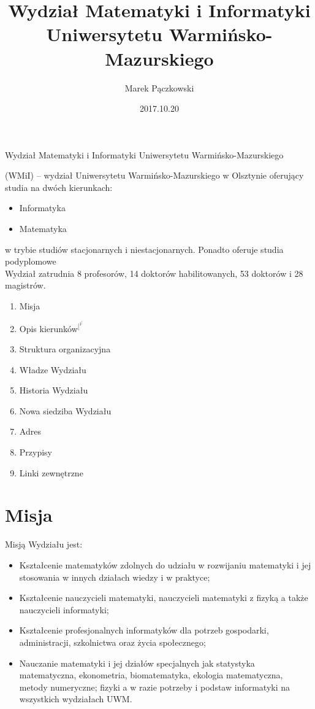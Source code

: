 ﻿\documentclass[a4paper,12pt]{article}
\date{2017.10.20}
\title {\bf Wydział Matematyki i Informatyki Uniwersytetu
Warmińsko-Mazurskiego
}
\author{Marek Pączkowski}
\begin{document}
\maketitle


 \begin{bf}  Wydział Matematyki i Informatyki Uniwersytetu Warmińsko-Mazurskiego\end{bf}  (WMiI) – wydział 
Uniwersytetu Warmińsko-Mazurskiego w Olsztynie oferujący studia na dwóch kierunkach: 
\begin{itemize}
 \item Informatyka 
 \item Matematyka 
\end{itemize} 
 w trybie studiów stacjonarnych i niestacjonarnych. Ponadto oferuje studia podyplomowe \vspace{0.2cm}
\\Wydział zatrudnia 8 profesorów, 14 doktorów habilitowanych, 53 doktorów i 28 magistrów.

\begin{enumerate}
 \item Misja 
 \item Opis kierunków$^[^1^]$
 \item Struktura organizacyjna
 \item Władze Wydziału
 \item Historia Wydziału
 \item Nowa siedziba Wydziału
 \item Adres
 \item Przypisy
\item Linki zewnętrzne
\end{enumerate}





\section*{Misja}
Misją Wydziału jest:
\begin{itemize}
\item  Kształcenie matematyków zdolnych do udziału w rozwijaniu matematyki i jej stosowania w innych działach wiedzy i w praktyce;
\item Kształcenie nauczycieli matematyki, nauczycieli matematyki z fizyką a także nauczycieli informatyki;
\item Kształcenie profesjonalnych informatyków dla potrzeb gospodarki, administracji, szkolnictwa oraz życia
społecznego;
\item Nauczanie matematyki i jej działów specjalnych jak statystyka matematyczna, ekonometria,
biomatematyka, ekologia matematyczna, metody numeryczne; fizyki a w razie potrzeby i podstaw
informatyki na wszystkich wydziałach UWM.
\end{itemize}
\newpage
\end{document}
